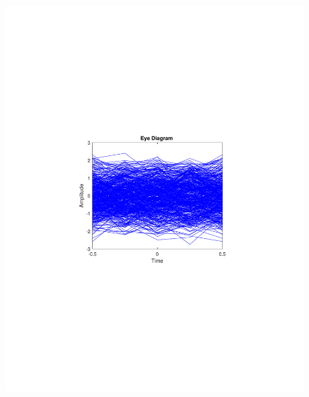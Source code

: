 \begin{refsection}
\begin{figure}[H]
\begin{minipage}{0.30\textwidth}
		\includegraphics[clip, trim=4cm 8cm 4cm 8cm, width=1\textwidth]{./sdf/m_qam_system/figures/expResults/intradyne/1_eye_4GBdInSig13dB_AfFec.pdf}
		\label{fig:4GBdSpecAftFec}
	\end{minipage}
	\begin{minipage}{0.30\textwidth}
		\centering

\end{minipage}
\end{figure}
\end{refsection}
